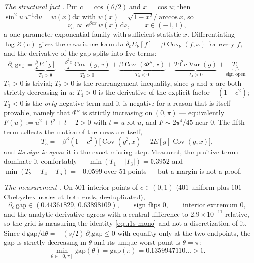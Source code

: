 \emph{The structural fact} \LT. Put $c=\cos(\theta/2)$ and $x=\cos u$; then
$\sin^{2}u\,u^{-1}\mathrm{d} u=w(x)\mathrm{d} x$ with $w(x)=\sqrt{1-x^{2}}/\arccos x$, so
\begin{equation}
\nu_{c}\ \propto\ e^{\beta cx}\,w(x)\,\mathrm{d} x,\qquad x\in(-1,1),
\label{eq:h1s-expfam}
\end{equation}
a one-parameter exponential family with sufficient statistic $x$. Differentiating $\log Z(c)$ gives
the covariance formula $\partial_{c}E_{\nu}[f]=\beta\operatorname{Cov}_{\nu}(f,x)$ for every $f$, and
the derivative of the gap splits into five terms:
\begin{equation}
\partial_{c}\,\mathrm{gap}=\underbrace{\tfrac{\beta}{2}E[g]}_{T_{1}>0}
+\underbrace{\tfrac{\beta^{2}c}{2}\operatorname{Cov}(g,x)}_{T_{2}>0}
+\underbrace{\beta\operatorname{Cov}(\Phi'',x)}_{T_{3}<0}
+\underbrace{2\beta^{2}c\operatorname{Var}(g)}_{T_{4}>0}
+\underbrace{T_{5}}_{\text{sign open}} .
\label{eq:h1s-mono}
\end{equation}
$T_{1}>0$ is trivial; $T_{2}>0$ is the rearrangement inequality, since $g$ and $x$ are both strictly
decreasing in $u$; $T_{4}>0$ is the derivative of the explicit factor $-(1-c^{2})$; $T_{3}<0$ is the
\emph{only} negative term and it is negative for a reason that is itself provable, namely that
$\Phi''$ is strictly increasing on $(0,\pi)$ --- equivalently $F(u):=u^{2}+t^{2}+t-2>0$ with
$t=u\cot u$, and $F\sim2u^{4}/45$ near $0$. The fifth term collects the motion of the measure itself,
\begin{equation}
T_{5}=-\beta^{3}(1-c^{2})\bigl[\operatorname{Cov}(g^{2},x)-2E[g]\operatorname{Cov}(g,x)\bigr],
\label{eq:h1s-T5}
\end{equation}
and \emph{its sign is open}: it is the exact missing step. Measured, the positive terms dominate it
comfortably --- $\min(T_{1}-|T_{3}|)=0.3952$ and $\min(T_{2}+T_{4}+T_{5})=+0.0599$ over $51$ points ---
but a margin is not a proof.

\emph{The measurement} \LC. On $501$ interior points of $c\in(0,1)$ ($401$ uniform plus $101$
Chebyshev nodes at both ends, de-duplicated),
\begin{equation}
\partial_{c}\,\mathrm{gap}\in(0.44361829,\ 0.63898109),\qquad
\text{sign flips }0,\qquad\text{interior extremum }0 ,
\label{eq:h1s-501}
\end{equation}
and the analytic derivative agrees with a central difference to $2.9\times10^{-11}$ relative, so the
grid is measuring the identity \eqref{eq:h1s-mono} and not a discretization of it. Since
$\mathrm{d}\,\mathrm{gap}/\mathrm{d}\theta=-(s/2)\,\partial_{c}\mathrm{gap}\le0$ with equality only at the two
endpoints, the gap is strictly decreasing in $\theta$ and its unique worst point is $\theta=\pi$:
\begin{equation}
\min_{\theta\in[0,\pi]}\mathrm{gap}(\theta)=\mathrm{gap}(\pi)=0.1359947110\ldots>0 .
\label{eq:h1s-min}
\end{equation}

